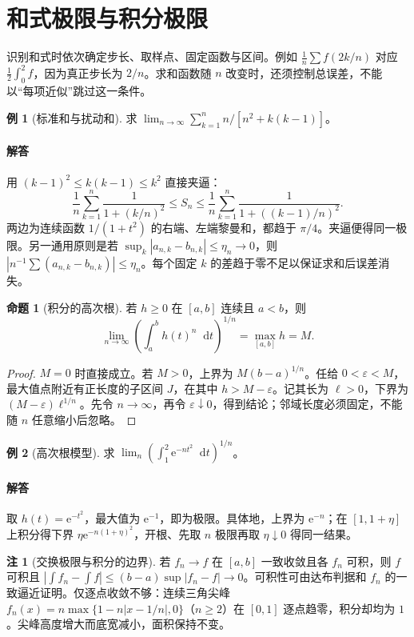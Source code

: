 \documentclass[UTF8,fontset=fandol,12pt,oneside,openany]{ctexrep}
\newcommand{\dd}{\mathop{}\!\mathrm d}
\newcommand{\ee}{\mathrm e}
\theoremstyle{definition}
\newtheorem{proposition}[theorem]{命题}
\newtheorem{example}{例}[chapter]
\newtheorem*{remark}{注}
\begin{document}
\section{和式极限与积分极限}
\label{lec:11:limits}
识别和式时依次确定步长、取样点、固定函数与区间。例如 $\frac1n\sum f(2k/n)$ 对应 $\frac12\int_0^2f$，因为真正步长为 $2/n$。求和函数随 $n$ 改变时，还须控制总误差，不能以“每项近似”跳过这一条件。
\begin{example}[标准和与扰动和]
求 $\lim_{n\to\infty}\sum_{k=1}^n n/[n^2+k(k-1)]$。
\end{example}
\paragraph{解答} 用 $(k-1)^2\le k(k-1)\le k^2$ 直接夹逼：
\[\frac1n\sum_{k=1}^n\frac1{1+(k/n)^2}\le S_n\le\frac1n\sum_{k=1}^n\frac1{1+((k-1)/n)^2}.\]
两边为连续函数 $1/(1+t^2)$ 的右端、左端黎曼和，都趋于 $\pi/4$。夹逼便得同一极限。另一通用原则是若 $\sup_k|a_{n,k}-b_{n,k}|\le\eta_n\to0$，则 $|n^{-1}\sum(a_{n,k}-b_{n,k})|\le\eta_n$。每个固定 $k$ 的差趋于零不足以保证求和后误差消失。
\begin{proposition}[积分的高次根]
若 $h\ge0$ 在 $[a,b]$ 连续且 $a<b$，则
\[\lim_{n\to\infty}\left(\int_a^bh(t)^n\dd t\right)^{1/n}=\max_{[a,b]}h=M.\]
\end{proposition}
\begin{proof}
$M=0$ 时直接成立。若 $M>0$，上界为 $M(b-a)^{1/n}$。任给 $0<\varepsilon<M$，最大值点附近有正长度的子区间 $J$，在其中 $h>M-\varepsilon$。记其长为 $\ell>0$，下界为 $(M-\varepsilon)\ell^{1/n}$。先令 $n\to\infty$，再令 $\varepsilon\downarrow0$，得到结论；邻域长度必须固定，不能随 $n$ 任意缩小后忽略。
\end{proof}
\begin{example}[高次根模型]
求 $\lim_n(\int_1^2\ee^{-nt^2}\dd t)^{1/n}$。
\end{example}
\paragraph{解答} 取 $h(t)=\ee^{-t^2}$，最大值为 $\ee^{-1}$，即为极限。具体地，上界为 $\ee^{-n}$；在 $[1,1+\eta]$ 上积分得下界 $\eta\ee^{-n(1+\eta)^2}$，开根、先取 $n$ 极限再取 $\eta\downarrow0$ 得同一结果。
\begin{remark}[交换极限与积分的边界]
若 $f_n\to f$ 在 $[a,b]$ 一致收敛且各 $f_n$ 可积，则 $f$ 可积且 $|\int f_n-\int f|\le(b-a)\sup|f_n-f|\to0$。可积性可由达布判据和 $f_n$ 的一致逼近证明。仅逐点收敛不够：连续三角尖峰 $f_n(x)=n\max\{1-n|x-1/n|,0\}$（$n\ge2$）在 $[0,1]$ 逐点趋零，积分却均为 $1$。尖峰高度增大而底宽减小，面积保持不变。
\end{remark}
\end{document}
